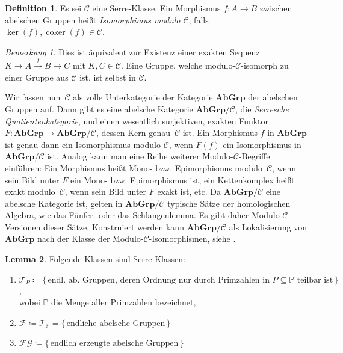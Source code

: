 \documentclass[11pt, a4paper, german]{article}
\theoremstyle{definition}
\newtheorem{lem}{Lemma}
\newtheorem{defn}[lem]{Definition}
\theoremstyle{remark}
\newtheorem*{bem}{Bemerkung}
\DeclareMathOperator{\coker}{coker} %
\newcommand{\SC}{\mathcal{C}} %
\newcommand{\FG}{\mathcal{FG}} %
\newcommand{\T}{\mathcal{T}} %
\newcommand{\F}{\mathcal{F}} %
\newcommand{\Primes}{\mathbb{P}} %
\newcommand{\AbGrp}{\mathbf{AbGrp}} %
\begin{document}
\begin{defn}
  Es sei $\SC$ eine Serre-Klasse.
  Ein Morphismus $f : A \to B$ zwischen abelschen Gruppen heißt \emph{Isomorphimus modulo $\SC$}, falls $\ker(f), \coker(f) \in \SC$. \\
\end{defn}

\vspace{-1.5em}
\begin{bem}
  Dies ist äquivalent zur Existenz einer exakten Sequenz $K \to A \xrightarrow{f} B \to C$ mit $K, C \in \SC$.
  Eine Gruppe, welche modulo-$\SC$-isomorph zu einer Gruppe aus $\SC$ ist, ist selbst in $\SC$.

  Wir fassen nun~$\SC$ als volle Unterkategorie der Kategorie $\AbGrp$ der abelschen Gruppen auf.
  Dann gibt es eine abelsche Kategorie $\AbGrp/\SC$, die \emph{Serresche Quotientenkategorie}, und einen wesentlich surjektiven, exakten Funktor $F : \AbGrp \to \AbGrp/\SC$, dessen Kern genau~$\SC$ ist.
  Ein Morphismus $f$ in $\AbGrp$ ist genau dann ein Isomorphismus modulo $\SC$, wenn $F(f)$ ein Isomorphismus in $\AbGrp/\SC$ ist.
  Analog kann man eine Reihe weiterer Modulo-$\SC$-Begriffe einführen: Ein Morphismus heißt Mono- bzw. Epimorphismus modulo~$\SC$, wenn sein Bild unter $F$ ein Mono- bzw. Epimorphismus ist, ein Kettenkomplex heißt exakt modulo~$\SC$, wenn sein Bild unter $F$ exakt ist, etc.
  Da $\AbGrp/\SC$ eine abelsche Kategorie ist, gelten in $\AbGrp/\SC$ typische Sätze der homologischen Algebra, wie das Fünfer- oder das Schlangenlemma.
  Es gibt daher Modulo-$\SC$-Versionen dieser Sätze.
  Konstruiert werden kann $\AbGrp/\SC$ als Lokalisierung von $\AbGrp$ nach der Klasse der Modulo-$\SC$-Isomorphismen, siehe \cite[\href{http://stacks.math.columbia.edu/tag/02MN}{Section 02MN}]{stacks-project}.
\end{bem}

\begin{lem}
  Folgende Klassen sind Serre-Klassen:
  \begin{enumerate}[label=\alph*)]
    \item $\T_P \coloneqq \{\, \text{endl. ab. Gruppen, deren Ordnung nur durch Primzahlen in $P \subseteq \Primes$ teilbar ist} \,\}$, \\
    wobei $\Primes$ die Menge aller Primzahlen bezeichnet,
    \item $\F \coloneqq \T_\Primes = \{\, \text{endliche abelsche Gruppen} \,\}$
    \item $\FG \coloneqq \{\, \text{endlich erzeugte abelsche Gruppen} \,\}$
  \end{enumerate}
\end{lem}
\end{document}
